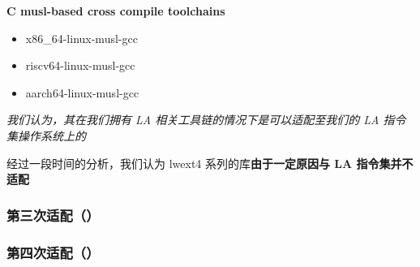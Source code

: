 \begin{center}
    \textbf{C musl-based cross compile toolchains}
    \begin{itemize}
        \centering
        \item x86_64-linux-musl-gcc
        \item riscv64-linux-musl-gcc
        \item aarch64-linux-musl-gcc
    \end{itemize}
\end{center}

\textit{我们认为，其在我们拥有 LA 相关工具链的情况下是可以适配至我们的 LA 指令集操作系统上的}

经过一段时间的分析，我们认为 lwext4 系列的库\textbf{由于一定原因与 LA 指令集并不适配}

\subsubsection{第三次适配（）}

\subsubsection{第四次适配（）}